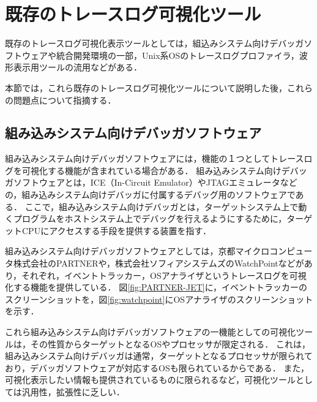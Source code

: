 \section{既存のトレースログ可視化ツール}

既存のトレースログ可視化表示ツールとしては，組込みシステム向けデバッガソフトウェアや統合開発環境の一部，Unix系OSのトレースログプロファイラ，波形表示用ツールの流用などがある．

本節では，これら既存のトレースログ可視化ツールについて説明した後，これらの問題点について指摘する．

\subsection{組み込みシステム向けデバッガソフトウェア}

組み込みシステム向けデバッガソフトウェアには，機能の１つとしてトレースログを可視化する機能が含まれている場合がある．
組み込みシステム向けデバッガソフトウェアとは，ICE（In-Circuit Emulator）やJTAGエミュレータなどの，組み込みシステム向けデバッガに付属するデバッグ用のソフトウェアである．
ここで，組み込みシステム向けデバッガとは，ターゲットシステム上で動くプログラムをホストシステム上でデバッグを行えるようにするために，ターゲットCPUにアクセスする手段を提供する装置を指す．

組み込みシステム向けデバッガソフトウェアとしては，京都マイクロコンピュータ株式会社のPARTNER\cite{PARTNER-JET}や，株式会社ソフィアシステムズのWatchPoint\cite{watchpoint}などがあり，それぞれ，イベントトラッカー，OSアナライザというトレースログを可視化する機能を提供している．
図\ref{fig:PARTNER-JET}に，イベントトラッカーのスクリーンショットを，図\ref{fig:watchpoint}にOSアナライザのスクリーンショットを示す．

これら組み込みシステム向けデバッガソフトウェアの一機能としての可視化ツールは，その性質からターゲットとなるOSやプロセッサが限定される．
これは，組み込みシステム向けデバッガは通常，ターゲットとなるプロセッサが限られており，デバッガソフトウェアが対応するOSも限られているからである．
また，可視化表示したい情報も提供されているものに限られるなど，可視化ツールとしては汎用性，拡張性に乏しい．

